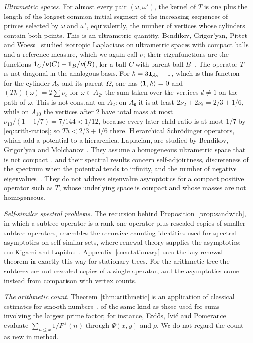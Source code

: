 \emph{Ultrametric spaces.} For almost every pair $(\omega,\omega')$, the
kernel of $T$ is one plus the length of the longest common initial segment
of the increasing sequences of primes selected by $\omega$ and $\omega'$,
equivalently, the number of vertices whose cylinders contain both points.
This is an ultrametric quantity. Bendikov, Grigor'yan, Pittet and
Woess~\cite{BGPW} studied isotropic Laplacians on ultrametric spaces with
compact balls and a reference measure, which we again call $\nu$; their
eigenfunctions are the functions $\mathbf 1_C/\nu(C)-\mathbf 1_B/\nu(B)$, for a ball
$C$ with parent ball $B$~\cite[Theorem~3.8]{BGPW}. The operator $T$ is not diagonal in the
analogous basis. For $h=3\mathbf 1_{A_2}-1$, which is this function for the
cylinder $A_2$ and its parent $\Omega$, one has $\left\langle \mathbf 1,h\right\rangle=0$ and
$(Th)(\omega)=2\sum\nu_d$ for $\omega\in A_2$, the sum taken over the
vertices $d\ne1$ on the path of $\omega$. This is not constant on $A_2$:
on $A_6$ it is at least $2\nu_2+2\nu_6=2/3+1/6$, while on $A_{10}$ the
vertices after $2$ have total mass at most $\nu_{10}/(1-1/7)=7/144<1/12$,
because every later child ratio is at most $1/7$ by \eqref{eq:arith-ratios};
so $Th<2/3+1/6$ there. Hierarchical Schr\"odinger operators, which add a potential
to a hierarchical Laplacian, are studied by Bendikov, Grigor'yan and
Molchanov~\cite{BGM}. They assume a homogeneous ultrametric space that is
not compact~\cite[Section~2.1]{BGM}, and their spectral results concern
self-adjointness, discreteness of the spectrum when the potential tends to
infinity, and the number of negative eigenvalues~\cite[Theorem~2.1]{BGM}.
They do not address eigenvalue asymptotics for a compact positive operator
such as $T$, whose underlying space is compact and whose masses are not
homogeneous.

\emph{Self-similar spectral problems.} The recursion behind
Proposition~\ref{prop:sandwich}, in which a subtree operator is a rank-one
operator plus rescaled copies of smaller subtree operators, resembles the
recursive counting identities used for spectral asymptotics on
self-similar sets, where renewal theory supplies the asymptotics; see
Kigami and Lapidus~\cite{KL}. Appendix~\ref{sec:stationary} uses the key
renewal theorem in exactly this way for stationary trees. For the
arithmetic tree the subtrees are not rescaled copies of a single operator,
and the asymptotics come instead from comparison with vertex counts.

\emph{The arithmetic count.} Theorem~\ref{thm:arithmetic} is an
application of classical estimates for smooth numbers~\cite{HT}, of the
same kind as those used for sums involving the largest prime factor; for
instance, Erd\H{o}s, Ivi\'c and Pomerance~\cite{EIP} evaluate
$\sum_{n\le x}1/P^+(n)$ through $\Psi(x,y)$ and $\rho$. We do not regard
the count as new in method.

